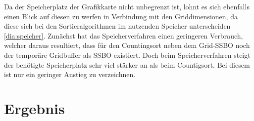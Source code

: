 \documentclass[intern,palatino]{cgBA}
\begin{document}
Da der Speicherplatz der Grafikkarte nicht unbegrenzt ist, lohnt es sich ebenfalls einen Blick auf diesen zu werfen in Verbindung mit den Griddimensionen, da diese sich bei den Sortieralgorithmen im nutzenden Speicher unterscheiden \ref{dia:speicher}.
\newline
Zunächst hat das Speicherverfahren einen geringeren Verbrauch, welcher daraus resultiert, dass für den Countingsort neben dem Grid-SSBO noch der temporäre Gridbuffer als SSBO existiert. Doch beim Speicherverfahren steigt der benötigte Speicherplatz sehr viel stärker an als beim Countigsort. Bei diesem ist nur ein geringer Anstieg zu verzeichnen.

\newpage

\section{Ergebnis}\label{ergebnis}
\end{document}

